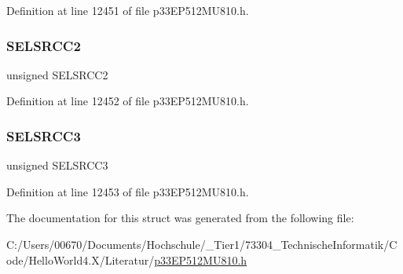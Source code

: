 Definition at line 12451 of file p33\+E\+P512\+M\+U810.\+h.

\mbox{\label{structtag_c_m2_m_s_k_s_r_c_b_i_t_s_a7cf665e6530692c6a4905ad1e53934ad}} 
\subsubsection{\texorpdfstring{S\+E\+L\+S\+R\+C\+C2}{SELSRCC2}}
{\footnotesize\ttfamily unsigned S\+E\+L\+S\+R\+C\+C2}



Definition at line 12452 of file p33\+E\+P512\+M\+U810.\+h.

\mbox{\label{structtag_c_m2_m_s_k_s_r_c_b_i_t_s_a232ce18f72b62eef1f6ac40a0c4b7f31}} 
\subsubsection{\texorpdfstring{S\+E\+L\+S\+R\+C\+C3}{SELSRCC3}}
{\footnotesize\ttfamily unsigned S\+E\+L\+S\+R\+C\+C3}



Definition at line 12453 of file p33\+E\+P512\+M\+U810.\+h.



The documentation for this struct was generated from the following file\+:\begin{DoxyCompactItemize}
\item 
C\+:/\+Users/00670/\+Documents/\+Hochschule/\+\_\+\+Tier1/73304\+\_\+\+Technische\+Informatik/\+Code/\+Hello\+World4.\+X/\+Literatur/\hyperlink{p33_e_p512_m_u810_8h}{p33\+E\+P512\+M\+U810.\+h}\end{DoxyCompactItemize}
